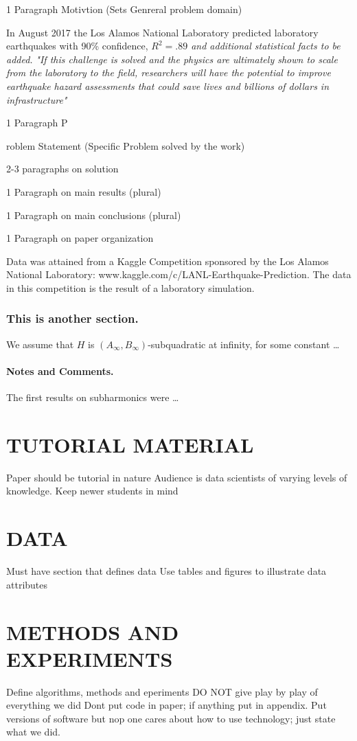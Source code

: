 \documentclass[]{llncs}
\begin{document}
1 Paragraph Motivtion (Sets Genreral problem domain) \par
In August 2017 the Los Alamos National Laboratory predicted laboratory earthquakes with 90\% confidence,  {\em $ R^{2}=.89 $ and additional statistical facts to be added.}\cite{Bertrand} 
{\em "If this challenge is solved and the physics are ultimately shown to scale from the laboratory to the field, researchers will have the potential to improve earthquake hazard assessments that could save lives and billions of dollars in infrastructure"}\cite{kaggle} \par
1 Paragraph P{roblem Statement (Specific Problem solved by the work) \par
2-3 paragraphs on solution \par
1 Paragraph on main results (plural) \par
1 Paragraph on main conclusions (plural) \par
1 Paragraph on paper organization \par
Data was attained from a Kaggle Competition sponsored by the Los Alamos National Laboratory:  www.kaggle.com/c/LANL-Earthquake-Prediction. The data in this competition is the result of a laboratory simulation.
\subsubsection*{This is another section.}
We assume that $H$ is $\left(A_{\infty}, B_{\infty}\right)$-subqua\-dra\-tic at infinity, for some constant \dots
\paragraph{Notes and Comments.} The first results on subharmonics were \dots
\section{TUTORIAL MATERIAL}
Paper should be tutorial in nature
Audience is data scientists of varying levels of knowledge. Keep newer students in mind
\section{DATA}
Must have section that defines data
Use tables and figures to illustrate data attributes
\section{METHODS AND EXPERIMENTS}
Define algorithms, methods and eperiments
DO NOT give play by play of everything we did
Dont put code in paper; if anything put in appendix.
Put versions of software but nop one cares about how to use technology; just state what we did.
}
\end{document}

